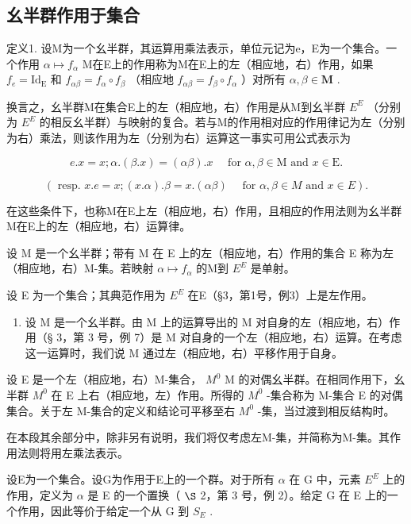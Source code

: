 \subsection{幺半群作用于集合}

定义1. 设M为一个幺半群，其运算用乘法表示，单位元记为e，E为一个集合。一个作用 \(\alpha \mapsto f_{\alpha}\) M在E上的作用称为M在E上的左（相应地，右）作用，如果 \(f_{e} = \mathrm{Id}_{\mathrm{E}}\) 和 \(f_{\alpha \beta} = f_{\alpha} \circ f_{\beta}\) （相应地 \(f_{\alpha \beta} = f_{\beta} \circ f_{\alpha}\) ）对所有 \(\alpha, \beta \in \mathbf{M}\) .

换言之，幺半群M在集合E上的左（相应地，右）作用是从M到幺半群 \(E^{E}\) （分别为 \(E^{E}\) 的相反幺半群）与映射的复合。若与M的作用相对应的作用律记为左（分别为右）乘法，则该作用为左（分别为右）运算这一事实可用公式表示为

\[
e. x = x; \alpha . (\beta . x) = (\alpha \beta). x \quad \text { for } \alpha , \beta \in \mathrm{M} \text { and } x \in \mathrm{E}.\tag{1}
\]

\[
(\text { resp. } x. e = x; (x. \alpha). \beta = x. (\alpha \beta) \quad \text { for } \alpha , \beta \in M \text { and } x \in E).
\]

在这些条件下，也称M在E上左（相应地，右）作用，且相应的作用法则为幺半群M在E上的左（相应地，右）运算律。

设 M 是一个幺半群；带有 M 在 E 上的左（相应地，右）作用的集合 E 称为左（相应地，右）M-集。若映射 \(\alpha \mapsto f_{\alpha}\) 的M到 \(E^{E}\) 是单射。

设 E 为一个集合；其典范作用为 \(E^{E}\) 在E（§3，第1号，例3）上是左作用。

\begin{enumerate}
\def\labelenumi{(\arabic{enumi})}
\setcounter{enumi}{1}
\tightlist
\item
  设 M 是一个幺半群。由 M 上的运算导出的 M 对自身的左（相应地，右）作用（§ 3，第 3 号，例 7）是 M 对自身的一个左（相应地，右）运算。在考虑这一运算时，我们说 M 通过左（相应地，右）平移作用于自身。
\end{enumerate}

设 E 是一个左（相应地，右）M-集合， \(M^{0}\) M 的对偶幺半群。在相同作用下，幺半群 \(M^{0}\) 在 E 上右（相应地，左）作用。所得的 \(M^{0}\) -集合称为 M-集合 E 的对偶集合。关于左 M-集合的定义和结论可平移至右 \(M^{0}\) -集，当过渡到相反结构时。

在本段其余部分中，除非另有说明，我们将仅考虑左M-集，并简称为M-集。其作用法则将用左乘法表示。

设E为一个集合。设G为作用于E上的一个群。对于所有 \(\alpha\) 在 G 中，元素 \(E^{E}\) 上的作用，定义为 \(\alpha\) 是 E 的一个置换（ \(\S\) 2，第 3 号，例 2）。给定 G 在 E 上的一个作用，因此等价于给定一个从 G 到 \(S_{E}\) .

